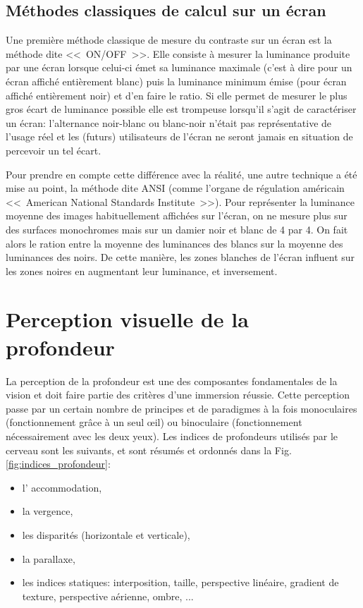 	\section{Méthodes classiques de calcul sur un écran}
	\par Une première méthode classique de mesure du contraste sur un écran est la méthode dite <<~ON/OFF~>>. Elle consiste à mesurer la luminance produite par une écran lorsque celui-ci émet sa luminance maximale (c'est à dire pour un écran affiché entièrement blanc) puis la luminance minimum émise (pour écran affiché entièrement noir) et d'en faire le ratio. Si elle permet de mesurer le plus gros écart de luminance possible elle est trompeuse lorsqu'il s'agit de caractériser un écran: l'alternance noir-blanc ou blanc-noir n'était pas représentative de l'usage réel et les (futurs) utilisateurs de l'écran ne seront jamais en situation de percevoir un tel écart.
	
	\par Pour prendre en compte cette différence avec la réalité, une autre technique a été mise au point, la méthode dite ANSI (comme l'organe de régulation américain <<~American National Standards Institute~>>). Pour représenter la luminance moyenne des images habituellement affichées sur l'écran, on ne mesure plus sur des surfaces monochromes mais sur un damier noir et blanc de 4 par 4. On fait alors le ration entre la moyenne des luminances des blancs sur la moyenne des luminances des noirs. De cette manière, les zones blanches de l'écran influent sur les zones noires en augmentant leur luminance, et inversement.
	
\chapter{Perception visuelle de la profondeur}
	\par La perception de la profondeur est une des composantes fondamentales de la vision et doit faire partie des critères d'une immersion réussie. Cette perception passe par un certain nombre de principes et de paradigmes à la fois monoculaires (fonctionnement grâce à un seul œil) ou binoculaire (fonctionnement nécessairement avec les deux yeux). Les indices de profondeurs utilisés par le cerveau sont les suivants, et sont résumés et ordonnés dans la Fig. \ref{fig:indices_profondeur}:
	\begin{itemize}
	\item l' accommodation,
	\item la vergence,
	\item les disparités (horizontale et verticale),
	\item la parallaxe,
	\item les indices statiques: interposition, taille, perspective linéaire, gradient de texture, perspective aérienne, ombre, ...
	\end{itemize}
	
